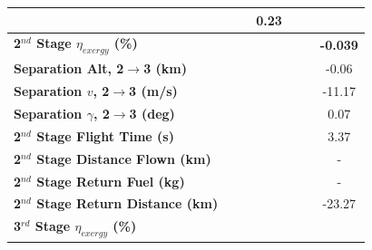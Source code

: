 \begin{table}[ht]
\begin{tabular}{l c c c c c c}
		& \firstsecondSeparationgammaCdOneHundredFive
		& \firstsecondSeparationgammaCdOneHundredTen
		&0.23
		\\
		\hline 
		\textbf{2$^{nd}$ Stage $\eta_{exergy}$ (\%)}
		& \textbf{\secondExergyEffCdNinety}
		& \textbf{\secondExergyEffCdNinetyFive}
		& \textbf{\secondExergyEffCdStandard}
		& \textbf{\secondExergyEffCdOneHundredFive}
		& \textbf{\secondExergyEffCdOneHundredTen}
		& \textbf{-0.039}
		\\
		\textbf{Separation Alt, 2$\rightarrow$3 (km)}
		& \secondthirdSeparationAltCdNinety
		& \secondthirdSeparationAltCdNinetyFive
		& \secondthirdSeparationAltCdStandard
		& \secondthirdSeparationAltCdOneHundredFive
		& \secondthirdSeparationAltCdOneHundredTen
		&-0.06
		\\
		\textbf{Separation $v$, 2$\rightarrow$3 (m/s)}
		& \secondthirdSeparationvCdNinety
		& \secondthirdSeparationvCdNinetyFive
		& \secondthirdSeparationvCdStandard
		& \secondthirdSeparationvCdOneHundredFive
		& \secondthirdSeparationvCdOneHundredTen
		&-11.17
		\\
		\textbf{Separation $\gamma$, 2$\rightarrow$3 (deg)}
		& \secondthirdSeparationgammaCdNinety
		& \secondthirdSeparationgammaCdNinetyFive
		& \secondthirdSeparationgammaCdStandard
		& \secondthirdSeparationgammaCdOneHundredFive
		& \secondthirdSeparationgammaCdOneHundredTen
		&0.07
		\\
		\textbf{2$^{nd}$ Stage Flight Time (s)}
		& \secondFlightTimeCdNinety
		& \secondFlightTimeCdNinetyFive
		& \secondFlightTimeCdStandard
		& \secondFlightTimeCdOneHundredFive
		& \secondFlightTimeCdOneHundredTen
		&3.37
		\\
		\textbf{2$^{nd}$ Stage Distance Flown (km)}
		& \SecondDistCdNinety
		& \SecondDistCdNinetyFive
		& \SecondDistCdStandard
		& \SecondDistCdOneHundredFive
		& \SecondDistCdOneHundredTen
		& -
		\\
		\textbf{2$^{nd}$ Stage Return Fuel (kg)}
		& \returnFuelCdNinety
		& \returnFuelCdNinetyFive
		& \returnFuelCdStandard
		& \returnFuelCdOneHundredFive
		& \returnFuelCdOneHundredTen
		& -
		\\
		\textbf{2$^{nd}$ Stage Return Distance (km)}
		& \returnDistCdNinety
		& \returnDistCdNinetyFive
		& \returnDistCdStandard
		& \returnDistCdOneHundredFive
		& \returnDistCdOneHundredTen
		&-23.27
		\\
		\hline 
		\textbf{3$^{rd}$ Stage $\eta_{exergy}$ (\%)}
		& \textbf{\thirddExergyEffCdNinety}
		& \textbf{\thirddExergyEffCdNinetyFive}
		& \textbf{\thirddExergyEffCdStandard}
		& \textbf{\thirddExergyEffCdOneHundredFive}

\end{tabular}
\end{table}
